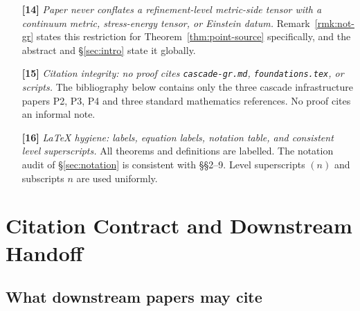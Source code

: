 \documentclass[11pt, a4paper]{amsart}
\theoremstyle{definition}
\begin{document}
\begin{itemize}
{  exact rank-one formula and spectrum / trace calculation.}
  Theorem~\ref{thm:point-source} states all four of rank, trace,
  spectrum, and traceless spectrum.
\item[\textbf{[14]}] \emph{Paper never conflates a
  refinement-level metric-side tensor with a continuum metric,
  stress-energy tensor, or Einstein datum.}
  Remark~\ref{rmk:not-gr} states this restriction for
  Theorem~\ref{thm:point-source} specifically, and the abstract
  and \S\ref{sec:intro} state it globally.
\item[\textbf{[15]}] \emph{Citation integrity: no proof cites
  \texttt{cascade-gr.md}, \texttt{foundations.tex}, or scripts.}
  The bibliography below contains only the three cascade
  infrastructure papers P2, P3, P4 and three standard
  mathematics references. No proof cites an informal note.
\item[\textbf{[16]}] \emph{LaTeX hygiene: labels, equation
  labels, notation table, and consistent level superscripts.}
  All theorems and definitions are labelled. The notation audit
  of \S\ref{sec:notation} is consistent with \S\S 2--9. Level
  superscripts $(n)$ and subscripts $n$ are used uniformly.
\end{itemize}

\section{Citation Contract and Downstream Handoff}
\label{sec:handoff}

\subsection{What downstream papers may cite}
\end{document}
